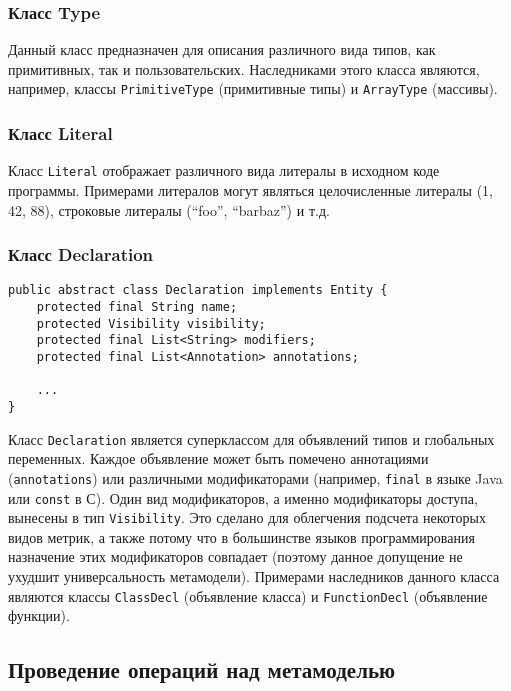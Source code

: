 \vspace{10pt}
\subsubsection{Класс Type}

Данный класс предназначен для описания различного вида типов, как примитивных,
так и пользовательских. Наследниками этого класса являются, например, классы
\texttt{PrimitiveType} (примитивные типы) и \texttt{ArrayType} (массивы).

\subsubsection{Класс Literal}

Класс \texttt{Literal} отображает различного вида литералы в исходном коде
программы. Примерами литералов могут являться целочисленные литералы (1, 42, 88),
строковые литералы (``foo'', ``barbaz'') и т.д.

\newpage
\subsubsection{Класс Declaration}

\begin{lstlisting}[caption={Класс Declaration}]
public abstract class Declaration implements Entity {
    protected final String name;
    protected Visibility visibility;
    protected final List<String> modifiers;
    protected final List<Annotation> annotations;

    ...
}
\end{lstlisting}

Класс \texttt{Declaration} является суперклассом для объявлений типов и
глобальных переменных. Каждое объявление может быть помечено аннотациями
(\texttt{annotations}) или различными модификаторами (например, \texttt{final} в
языке Java или \texttt{const} в С). Один вид модификаторов, а именно
модификаторы доступа, вынесены в тип \texttt{Visibility}. Это сделано для
облегчения подсчета некоторых видов метрик, а также потому что в большинстве
языков программирования назначение этих модификаторов совпадает (поэтому данное
допущение не ухудшит универсальность метамодели). Примерами наследников
данного класса являются классы \texttt{ClassDecl} (объявление класса) и
\texttt{FunctionDecl} (объявление функции).

\vspace{10pt}
\subsection{Проведение операций над метамоделью}
\label{subsec:metamodel_operations}

